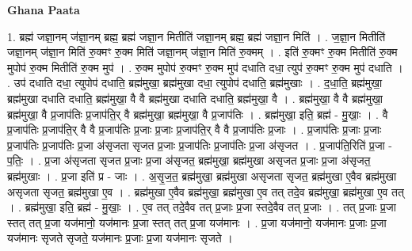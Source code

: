 \documentclass[17pt]{extarticle}
\begin{document}
\textbf{Ghana Paata } \newline

1. ब्रह्म॑ जज्ञा॒नम् ज॑ज्ञा॒नम् ब्रह्म॒ ब्रह्म॑ जज्ञा॒न मितीति॑ जज्ञा॒नम् ब्रह्म॒ ब्रह्म॑ जज्ञा॒न मिति॑ । . ज॒ज्ञा॒न मितीति॑ जज्ञा॒नम् ज॑ज्ञा॒न मिति॑ रु॒क्मꣳ रु॒क्म मिति॑ जज्ञा॒नम् ज॑ज्ञा॒न मिति॑ रु॒क्मम् । . इति॑ रु॒क्मꣳ रु॒क्म मितीति॑ रु॒क्म मुपोप॑ रु॒क्म मितीति॑ रु॒क्म मुप॑ । . रु॒क्म मुपोप॑ रु॒क्मꣳ रु॒क्म मुप॑ दधाति दधा॒ त्युप॑ रु॒क्मꣳ रु॒क्म मुप॑ दधाति । . उप॑ दधाति दधा॒ त्युपोप॑ दधाति॒ ब्रह्म॑मुखा॒ ब्रह्म॑मुखा दधा॒ त्युपोप॑ दधाति॒ ब्रह्म॑मुखाः । . द॒धा॒ति॒ ब्रह्म॑मुखा॒ ब्रह्म॑मुखा दधाति दधाति॒ ब्रह्म॑मुखा॒ वै वै ब्रह्म॑मुखा दधाति दधाति॒ ब्रह्म॑मुखा॒ वै । . ब्रह्म॑मुखा॒ वै वै ब्रह्म॑मुखा॒ ब्रह्म॑मुखा॒ वै प्र॒जाप॑तिः प्र॒जाप॑ति॒र् वै ब्रह्म॑मुखा॒ ब्रह्म॑मुखा॒ वै प्र॒जाप॑तिः । . ब्रह्म॑मुखा॒ इति॒ ब्रह्म॑ - मु॒खाः॒ । . वै प्र॒जाप॑तिः प्र॒जाप॑ति॒र् वै वै प्र॒जाप॑तिः प्र॒जाः प्र॒जाः प्र॒जाप॑ति॒र् वै वै प्र॒जाप॑तिः प्र॒जाः । . प्र॒जाप॑तिः प्र॒जाः प्र॒जाः प्र॒जाप॑तिः प्र॒जाप॑तिः प्र॒जा अ॑सृजता सृजत प्र॒जाः प्र॒जाप॑तिः प्र॒जाप॑तिः प्र॒जा अ॑सृजत । . प्र॒जाप॑ति॒रिति॑ प्र॒जा - प॒तिः॒ । . प्र॒जा अ॑सृजता सृजत प्र॒जाः प्र॒जा अ॑सृजत॒ ब्रह्म॑मुखा॒ ब्रह्म॑मुखा असृजत प्र॒जाः प्र॒जा अ॑सृजत॒ ब्रह्म॑मुखाः । . प्र॒जा इति॑ प्र - जाः । . अ॒सृ॒ज॒त॒ ब्रह्म॑मुखा॒ ब्रह्म॑मुखा असृजता सृजत॒ ब्रह्म॑मुखा ए॒वैव ब्रह्म॑मुखा असृजता सृजत॒ ब्रह्म॑मुखा ए॒व । . ब्रह्म॑मुखा ए॒वैव ब्रह्म॑मुखा॒ ब्रह्म॑मुखा ए॒व तत् तदे॒व ब्रह्म॑मुखा॒ ब्रह्म॑मुखा ए॒व तत् । . ब्रह्म॑मुखा॒ इति॒ ब्रह्म॑ - मु॒खाः॒ । . ए॒व तत् तदे॒वैव तत् प्र॒जाः प्र॒जा स्तदे॒वैव तत् प्र॒जाः । . तत् प्र॒जाः प्र॒जा स्तत् तत् प्र॒जा यज॑मानो॒ यज॑मानः प्र॒जा स्तत् तत् प्र॒जा यज॑मानः । . प्र॒जा यज॑मानो॒ यज॑मानः प्र॒जाः प्र॒जा यज॑मानः सृजते सृजते॒ यज॑मानः प्र॒जाः प्र॒जा यज॑मानः सृजते । \newline
\end{document}

